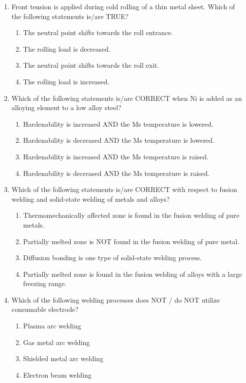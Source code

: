\documentclass[journal]{IEEEtran}
\theoremstyle{remark}
\begin{document}
\begin{enumerate}[resume]
\item Front tension is applied during cold rolling of a thin metal sheet. Which of the following statements is/are TRUE? \hfill{}
\begin{enumerate}
\item The neutral point shifts towards the roll entrance.
\item The rolling load is decreased.
\item The neutral point shifts towards the roll exit.
\item The rolling load is increased.
\end{enumerate}

\item Which of the following statements is/are CORRECT when Ni is added as an alloying element to a low alloy steel? \hfill{}
\begin{enumerate}
\item Hardenability is increased AND the Ms temperature is lowered.
\item Hardenability is decreased AND the Ms temperature is lowered.
\item Hardenability is increased AND the Ms temperature is raised.
\item Hardenability is decreased AND the Ms temperature is raised.
\end{enumerate}

\item Which of the following statements is/are CORRECT with respect to fusion welding and solid-state welding of metals and alloys? \hfill{}
\begin{enumerate}
\item Thermomechanically affected zone is found in the fusion welding of pure metals.
\item Partially melted zone is NOT found in the fusion welding of pure metal.
\item Diffusion bonding is one type of solid-state welding process.
\item Partially melted zone is found in the fusion welding of alloys with a large freezing range.
\end{enumerate}

\item Which of the following welding processes does NOT / do NOT utilize consumable electrode? \hfill{}
\begin{multicols}{2}
\begin{enumerate}
\item Plasma arc welding
\item Gas metal arc welding
\item Shielded metal arc welding
\item Electron beam welding
\end{enumerate}
\end{multicols}


\end{enumerate}
\end{document}
